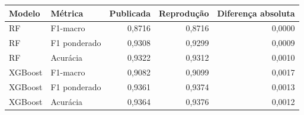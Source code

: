 \begin{tabular}{llrrr}
\toprule
Modelo & Métrica & Publicada & Reprodução & Diferença absoluta \\
\midrule
RF & F1-macro & 0,8716 & 0,8716 & 0,0000 \\
RF & F1 ponderado & 0,9308 & 0,9299 & 0,0009 \\
RF & Acurácia & 0,9322 & 0,9312 & 0,0010 \\
XGBoost & F1-macro & 0,9082 & 0,9099 & 0,0017 \\
XGBoost & F1 ponderado & 0,9361 & 0,9374 & 0,0013 \\
XGBoost & Acurácia & 0,9364 & 0,9376 & 0,0012 \\
\bottomrule
\end{tabular}
